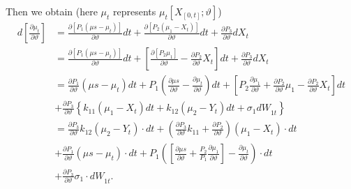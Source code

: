 \documentclass[11pt]{article}%
\theoremstyle{definition}
\begin{document}
Then we obtain (here $\mu_{t}$ represents $\mu_{t}[X_{[0,t]};\vartheta]$)
\begin{align*}
d\left[  \frac{\partial\mu_{t}}{\partial\vartheta}\right]   &  =\frac
{\partial\left[  P_{1}\left(  \mu s-\mu_{t}\right)  \right]  }{\partial
\vartheta}dt+\frac{\partial\left[  P_{2}\left(  \mu_{1}-X_{t}\right)  \right]
}{\partial\vartheta}dt+\frac{\partial P_{3}}{\partial\vartheta}dX_{t}\\
&  =\frac{\partial\left[  P_{1}\left(  \mu s-\mu_{t}\right)  \right]
}{\partial\vartheta}dt+\left[  \frac{\partial\left[  P_{2}\mu_{1}\right]
}{\partial\vartheta}-\frac{\partial P_{2}}{\partial\vartheta}X_{t}\right]
dt+\frac{\partial P_{3}}{\partial\vartheta}dX_{t}\\
&  =\frac{\partial P_{1}}{\partial\vartheta}\left(  \mu s-\mu_{t}\right)
dt+P_{1}\left(  \frac{\partial\mu s}{\partial\vartheta}-\frac{\partial\mu_{t}%
}{\partial\vartheta}\right)  dt+\left[  P_{2}\frac{\partial\mu_{1}}%
{\partial\vartheta}+\frac{\partial P_{2}}{\partial\vartheta}\mu_{1}%
-\frac{\partial P_{2}}{\partial\vartheta}X_{t}\right]  dt\\
&  +\frac{\partial P_{3}}{\partial\vartheta}\left\{  {k_{11}}\left(  \mu
_{1}-X_{t}\right)  dt+{k_{12}}\left(  \mu_{2}-Y_{t}\right)  dt+{\sigma_{1}%
dW}_{1t}\right\}  \\
&  =\frac{\partial P_{3}}{\partial\vartheta}{k_{12}}\left(  \mu_{2}%
-Y_{t}\right)  \cdot dt+\left(  \frac{\partial P_{3}}{\partial\vartheta
}{k_{11}+}\frac{\partial P_{2}}{\partial\vartheta}\right)  \left(  \mu
_{1}-X_{t}\right)  \cdot dt\\
&  +\frac{\partial P_{1}}{\partial\vartheta}\left(  \mu s-\mu_{t}\right)
\cdot dt+P_{1}\left(  \left[  \frac{\partial\mu s}{\partial\vartheta}%
+\frac{P_{2}}{P_{1}}\frac{\partial\mu_{1}}{\partial\vartheta}\right]
-\frac{\partial\mu_{t}}{\partial\vartheta}\right)  \cdot dt\\
&  +\frac{\partial P_{3}}{\partial\vartheta}{\sigma_{1}\cdot dW}_{1t}.
\end{align*}
\end{document}
